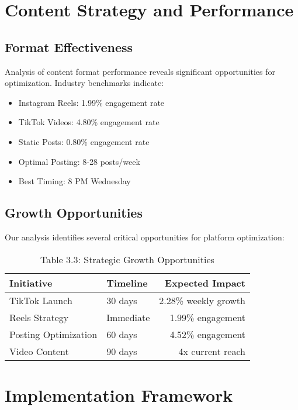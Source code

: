 \documentclass[12pt]{report}
\begin{document}
\chapter{Content Strategy and Performance}

\section{Format Effectiveness}

Analysis of content format performance reveals significant opportunities for optimization. Industry benchmarks indicate:

\begin{itemize}
    \item Instagram Reels: 1.99\% engagement rate
    \item TikTok Videos: 4.80\% engagement rate
    \item Static Posts: 0.80\% engagement rate
    \item Optimal Posting: 8-28 posts/week
    \item Best Timing: 8 PM Wednesday
\end{itemize}

\section{Growth Opportunities}

Our analysis identifies several critical opportunities for platform optimization:

\begin{table}[h]
\caption{Table 3.3: Strategic Growth Opportunities}
\begin{tabular}{@{}llr@{}}
\toprule
\textbf{Initiative} & \textbf{Timeline} & \textbf{Expected Impact} \\
\midrule
TikTok Launch & 30 days & 2.28\% weekly growth \\
Reels Strategy & Immediate & 1.99\% engagement \\
Posting Optimization & 60 days & 4.52\% engagement \\
Video Content & 90 days & 4x current reach \\
\bottomrule
\end{tabular}
\end{table}

\chapter{Implementation Framework}
\end{document}
